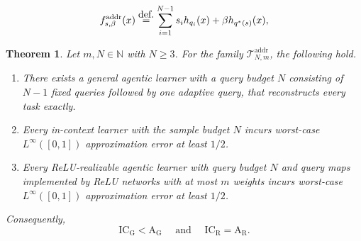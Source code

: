 \documentclass[10pt,a4paper]{amsart}
\newtheorem{theorem}{Theorem}
\newcommand{\AG}{\mathrm{A_G}}
\newcommand{\AR}{\mathrm{A_R}}
\newcommand{\ICG}{\mathrm{IC_G}}
\newcommand{\ICR}{\mathrm{IC_R}}
\newcommand{\eqdef }{\ensuremath{\stackrel{\mbox{\upshape\tiny def.}}{=}}}
\begin{document}
\begin{equation} \label{eq:addrtasks}
    f^{\mathrm{addr}}_{s,\beta}(x)
    \eqdef 
    \sum_{i=1}^{N-1} s_i h_{q_i}(x)
    +
    \beta h_{q^\ast(s)}(x),
\end{equation}

\begin{theorem}
\label{thm:address}
Let $m,N\in\mathbb{N}$ with $N\geq 3$.
For the family $\mathcal{T}_{N,m}^{\mathrm{addr}}$, the following hold.
\begin{enumerate}
    \item[\rm (i)] %
    There exists a general agentic learner with a query budget $N$ consisting of $N-1$ fixed queries followed by one adaptive query, that reconstructs every task exactly.
    \item[\rm (ii)] Every in-context learner with the sample budget $N$ incurs worst-case
    $L^\infty([0,1])$ approximation error at least $1/2$.
    \item[(iii)] Every ReLU-realizable agentic learner with query budget \(N\) and query maps implemented by ReLU networks with at most $m$ weights incurs worst-case 
    \(L^\infty([0,1])\) approximation error at least \(1/2\). 
\end{enumerate}
Consequently, 
\begin{equation*}
    \ICG<\AG \quad\text{ and }\quad \ICR=\AR.
\end{equation*}
\end{theorem}
\end{document}
